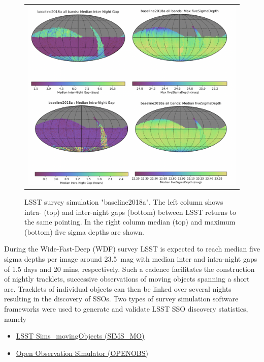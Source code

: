 \begin{figure}[tb!]
\begin{tabular}{c}
\includegraphics[width=1\linewidth]{figs/baseline2018a.png}
\end{tabular}
\caption{LSST survey simulation "baseline2018a". The left column shows intra- (top) and inter-night gaps (bottom) between \gls{LSST} returns to the same pointing. In the right column median (top) and maximum (bottom) five sigma depths are shown.}
\label{fig:gaps}       %
\end{figure}
%
During the \gls{Wide-Fast-Deep} (WDF) survey \gls{LSST} is expected to reach median five sigma depths per image around \SI{23.5}{mag} with median inter and intra-night gaps of 1.5 days and 20 mins, respectively. Such a cadence facilitates the construction of nightly tracklets, successive observations of
moving objects spanning a short arc. Tracklets of individual objects can then be linked over several nights resulting in the discovery of SSOs.
Two types of survey simulation software frameworks were used to generate and validate \gls{LSST} \gls{SSO} discovery statistics, namely
\begin{itemize}
\item \href{https://epyc.astro.washington.edu/~lynnej/sims_movingObjects/lsst.sims.movingObjects.html}{LSST Sims\_movingObjects (SIMS\_MO)}
\item \href{https://github.com/eggls6/openobs}{Open Observation Simulator (OPENOBS)}
\end{itemize}

